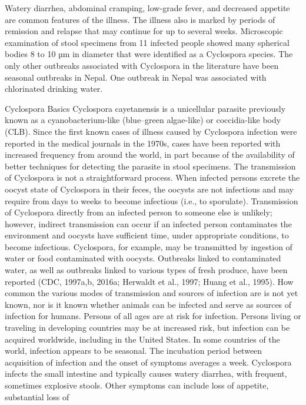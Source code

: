 \documentclass{article}
\begin{document}
Watery diarrhea, abdominal cramping, low-grade fever, and decreased
appetite are common features of the illness. The illness also is marked
by periods of remission and relapse that may continue for up to several
weeks. Microscopic examination of stool specimens from 11 infected
people showed many spherical bodies 8 to 10 µm in diameter that were
identified as a Cyclospora species. The only other outbreaks associated
with Cyclospora in the literature have been seasonal outbreaks in Nepal.
One outbreak in Nepal was associated with chlorinated drinking water.

Cyclospora Basics Cyclospora cayetanensis is a unicellular parasite
previously known as a cyanobacterium-like (blue--green algae-like) or
coccidia-like body (CLB). Since the first known cases of illness caused
by Cyclospora infection were reported in the medical journals in the
1970s, cases have been reported with increased frequency from around the
world, in part because of the availability of better techniques for
detecting the parasite in stool specimens. The transmission of
Cyclospora is not a straightforward process. When infected persons
excrete the oocyst state of Cyclospora in their feces, the oocysts are
not infectious and may require from days to weeks to become infectious
(i.e., to sporulate). Transmission of Cyclospora directly from an
infected person to someone else is unlikely; however, indirect
transmission can occur if an infected person contaminates the
environment and oocysts have sufficient time, under appropriate
conditions, to become infectious. Cyclospora, for example, may be
transmitted by ingestion of water or food contaminated with oocysts.
Outbreaks linked to contaminated water, as well as outbreaks linked to
various types of fresh produce, have been reported (CDC, 1997a,b, 2016a;
Herwaldt et al., 1997; Huang et al., 1995). How common the various modes
of transmission and sources of infection are is not yet known, nor is it
known whether animals can be infected and serve as sources of infection
for humans. Persons of all ages are at risk for infection. Persons
living or traveling in developing countries may be at increased risk,
but infection can be acquired worldwide, including in the United States.
In some countries of the world, infection appears to be seasonal. The
incubation period between acquisition of infection and the onset of
symptoms averages a week. Cyclospora infects the small intestine and
typically causes watery diarrhea, with frequent, sometimes explosive
stools. Other symptoms can include loss of appetite, substantial loss of
\end{document}
